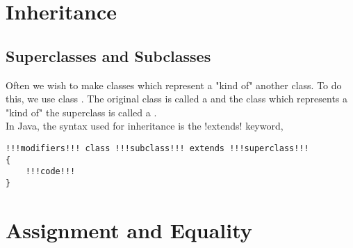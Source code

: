 \documentclass[11pt]{article}
\begin{document}
\section{Inheritance}
\subsection{Superclasses and Subclasses}
Often we wish to make classes which represent a "kind of" another class. To do this, we use class . The original class is called a  and the class which represents a "kind of" the superclass is called a . 
\\ In Java, the syntax used for inheritance is the \inlineJava!extends! keyword, 
\vspace{-20pt}
\begin{lstlisting}[style=javaSyntax]
!!!modifiers!!! class !!!subclass!!! extends !!!superclass!!!
{
    !!!code!!!
}
\end{lstlisting}
\begin{eg}
    
\end{eg}
\pagebreak
\section{Assignment and Equality}
\end{document}
